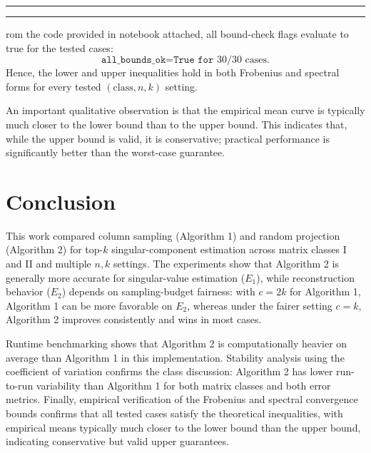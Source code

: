 \documentclass[8pt]{article}
\newcounter{questionCounter}
\newenvironment{question}[2][\arabic{questionCounter}]{%
    \addtocounter{questionCounter}{1}%
    \setcounter{partCounter}{0}%
    \vspace{.25in} \hrule \vspace{0.4em}%
        \noindent{\bf \iftoggle{questionnumbers}{#1: }{}#2}%
    \vspace{0.8em} \hrule \vspace{.10in}%
}{$ $\newpage}
\newcounter{partCounter}[questionCounter]
\begin{document}
\begin{question}
From the code provided in notebook attached, all bound-check flags evaluate to true for the tested cases:
\[
\texttt{all\_bounds\_ok=True for }30/30\text{ cases}.
\]
Hence, the lower and upper inequalities hold in both Frobenius and spectral forms for every tested $(\text{class},n,k)$ setting.

An important qualitative observation is that the empirical mean curve is typically much closer to the lower bound than to the upper bound. This indicates that, while the upper bound is valid, it is conservative; practical performance is significantly better than the worst-case guarantee.

\section{Conclusion}

This work compared column sampling (Algorithm 1) and random projection (Algorithm 2) for top-$k$ singular-component estimation across matrix classes I and II and multiple $n,k$ settings. The experiments show that Algorithm 2 is generally more accurate for singular-value estimation ($E_1$), while reconstruction behavior ($E_2$) depends on sampling-budget fairness: with $c=2k$ for Algorithm 1, Algorithm 1 can be more favorable on $E_2$, whereas under the fairer setting $c=k$, Algorithm 2 improves consistently and wins in most cases.

Runtime benchmarking shows that Algorithm 2 is computationally heavier on average than Algorithm 1 in this implementation. Stability analysis using the coefficient of variation confirms the class discussion: Algorithm 2 has lower run-to-run variability than Algorithm 1 for both matrix classes and both error metrics. Finally, empirical verification of the Frobenius and spectral convergence bounds confirms that all tested cases satisfy the theoretical inequalities, with empirical means typically much closer to the lower bound than the upper bound, indicating conservative but valid upper guarantees.



\end{question}
\end{document}
